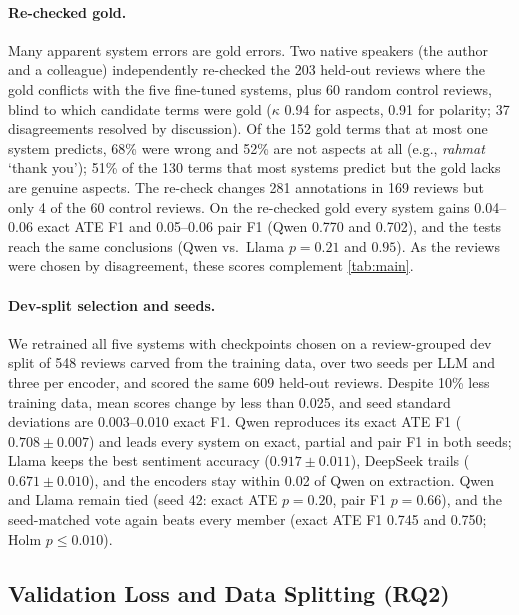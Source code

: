 \documentclass[runningheads]{llncs}
\begin{document}
\paragraph{Re-checked gold.} Many apparent system errors are gold errors. Two native speakers (the author and a colleague) independently re-checked the 203 held-out reviews where the gold conflicts with the five fine-tuned systems, plus 60 random control reviews, blind to which candidate terms were gold ($\kappa$ 0.94 for aspects, 0.91 for polarity; 37 disagreements resolved by discussion). Of the 152 gold terms that at most one system predicts, 68\% were wrong and 52\% are not aspects at all (e.g., \textit{rahmat} `thank you'); 51\% of the 130 terms that most systems predict but the gold lacks are genuine aspects. The re-check changes 281 annotations in 169 reviews but only 4 of the 60 control reviews. On the re-checked gold every system gains 0.04--0.06 exact ATE F1 and 0.05--0.06 pair F1 (Qwen 0.770 and 0.702), and the tests reach the same conclusions (Qwen vs.\ Llama $p{=}0.21$ and $0.95$). As the reviews were chosen by disagreement, these scores complement \cref{tab:main}.

\paragraph{Dev-split selection and seeds.} We retrained all five systems with checkpoints chosen on a review-grouped dev split of 548 reviews carved from the training data, over two seeds per LLM and three per encoder, and scored the same 609 held-out reviews. Despite 10\% less training data, mean scores change by less than 0.025, and seed standard deviations are 0.003--0.010 exact F1. Qwen reproduces its exact ATE F1 ($0.708\pm0.007$) and leads every system on exact, partial and pair F1 in both seeds; Llama keeps the best sentiment accuracy ($0.917\pm0.011$), DeepSeek trails ($0.671\pm0.010$), and the encoders stay within 0.02 of Qwen on extraction. Qwen and Llama remain tied (seed 42: exact ATE $p{=}0.20$, pair F1 $p{=}0.66$), and the seed-matched vote again beats every member (exact ATE F1 0.745 and 0.750; Holm $p \le 0.010$).


\subsection{Validation Loss and Data Splitting (RQ2)}
\label{sec:res_loss}
\end{document}
